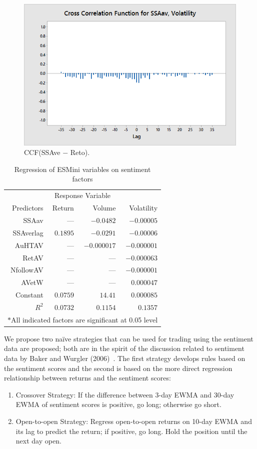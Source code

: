 	\begin{figure}[!ht]
	\centering
	\includegraphics[width=\textwidth]{chapters/chapter_news_an/figures/ch4sec4ssaavvola} 
	\caption{CCF(SSAve $-$ Reto). \label{fig:ccfssavvol}}
	\end{figure}

	\begin{table}[!ht]
	\centering
	\caption{Regression of ESMini variables on sentiment factors \label{tab:regesmini}}
	\begin{tabular}{rrrr}
	\multicolumn{4}{c}{Response Variable} \\
	Predictors & Return & Volume & Volatility \\ \hline
	SSAav & --- & $-0.0482$ & $-0.00005$ \\
	SSAverlag & $0.1895$ & $-0.0291$ & $-0.00006$ \\
	AuHTAV & --- & $-0.000017$ & $-0.000001$ \\
	RetAV & --- & --- & $-0.000063$ \\
	NfollowAV & --- & --- & $-0.000001$ \\
	AVetW & --- & --- & $0.000047$ \\
	Constant & $0.0759$ & $14.41$ & $0.000085$ \\ \hline
	$R^2$ & $0.0732$ & $0.1154$ & $0.1357$ \\ \hline
	\multicolumn{4}{c}{$\ast$All indicated factors are significant at 0.05 level}
	\end{tabular} 
	\end{table}

We propose two na\"ive strategies that can be used for trading using the sentiment data are proposed; both are in the spirit of the discussion related to sentiment data by Baker and Wurgler (2006)~\cite{baker2006investor}. The first strategy develops rules based on the sentiment scores and the second is based on the more direct regression relationship between returns and the sentiment scores: \begin{enumerate}[1.]
\item Crossover Strategy: If the difference between 3-day EWMA and 30-day EWMA of sentiment scores is positive, go long; otherwise go short. 
\item Open-to-open Strategy: Regress open-to-open returns on 10-day EWMA and its lag to predict the return; if positive, go long. Hold the position until the next day open. 
\end{enumerate}


